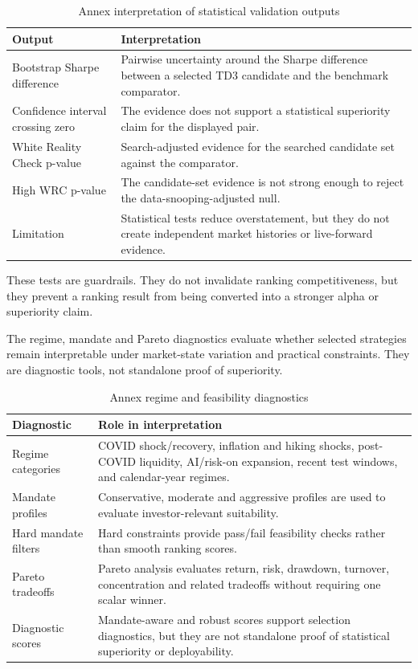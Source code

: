 \documentclass[12pt]{article}
\begin{document}
\begin{table}[H]
\centering
\caption{Annex interpretation of statistical validation outputs}
\scriptsize
\begin{tabularx}{\textwidth}{L{0.27\textwidth}Y}
\toprule
\textbf{Output} & \textbf{Interpretation} \\
\midrule
Bootstrap Sharpe difference & Pairwise uncertainty around the Sharpe difference between a selected TD3 candidate and the benchmark comparator. \\
Confidence interval crossing zero & The evidence does not support a statistical superiority claim for the displayed pair. \\
White Reality Check p-value & Search-adjusted evidence for the searched candidate set against the comparator. \\
High WRC p-value & The candidate-set evidence is not strong enough to reject the data-snooping-adjusted null. \\
Limitation & Statistical tests reduce overstatement, but they do not create independent market histories or live-forward evidence. \\
\bottomrule
\end{tabularx}
\end{table}

These tests are guardrails. They do not invalidate ranking competitiveness, but they prevent a ranking result from being converted into a stronger alpha or superiority claim.


The regime, mandate and Pareto diagnostics evaluate whether selected strategies remain interpretable under market-state variation and practical constraints. They are diagnostic tools, not standalone proof of superiority.

\begin{table}[H]
\centering
\caption{Annex regime and feasibility diagnostics}
\scriptsize
\begin{tabularx}{\textwidth}{L{0.24\textwidth}Y}
\toprule
\textbf{Diagnostic} & \textbf{Role in interpretation} \\
\midrule
Regime categories & COVID shock/recovery, inflation and hiking shocks, post-COVID liquidity, AI/risk-on expansion, recent test windows, and calendar-year regimes. \\
Mandate profiles & Conservative, moderate and aggressive profiles are used to evaluate investor-relevant suitability. \\
Hard mandate filters & Hard constraints provide pass/fail feasibility checks rather than smooth ranking scores. \\
Pareto tradeoffs & Pareto analysis evaluates return, risk, drawdown, turnover, concentration and related tradeoffs without requiring one scalar winner. \\
Diagnostic scores & Mandate-aware and robust scores support selection diagnostics, but they are not standalone proof of statistical superiority or deployability. \\
\bottomrule
\end{tabularx}
\end{table}
\end{document}

